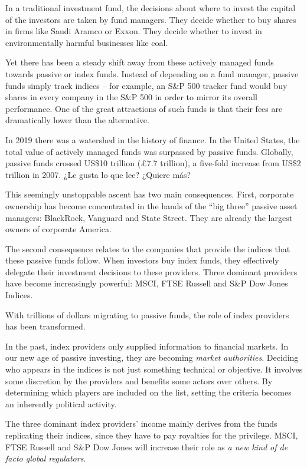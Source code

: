 \documentclass[
]{book}
\begin{document}
In a traditional investment fund, the decisions about where to invest the capital of the investors are taken by fund managers. They decide whether to buy shares in firms like Saudi Aramco or Exxon. They decide whether to invest in environmentally harmful businesses like coal.

Yet there has been a steady shift away from these actively managed funds towards passive or index funds. Instead of depending on a fund manager, passive funds simply track indices -- for example, an S\&P 500 tracker fund would buy shares in every company in the S\&P 500 in order to mirror its overall performance. One of the great attractions of such funds is that their fees are dramatically lower than the alternative.

In 2019 there was a watershed in the history of finance. In the United States, the total value of actively managed funds was surpassed by passive funds. Globally, passive funds crossed US\$10 trillion (£7.7 trillion), a five-fold increase from US\$2 trillion in 2007.
¿Le gusta lo que lee? ¿Quiere más?

This seemingly unstoppable ascent has two main consequences. First, corporate ownership has become concentrated in the hands of the ``big three'' passive asset managers: BlackRock, Vanguard and State Street. They are already the largest owners of corporate America.

The second consequence relates to the companies that provide the indices that these passive funds follow. When investors buy index funds, they effectively delegate their investment decisions to these providers. Three dominant providers have become increasingly powerful: MSCI, FTSE Russell and S\&P Dow Jones Indices.

With trillions of dollars migrating to passive funds, the role of index providers has been transformed.

In the past, index providers only supplied information to financial markets. In our new age of passive investing, they are becoming \emph{market authorities}.
Deciding who appears in the indices is not just something technical or objective. It involves some discretion by the providers and benefits some actors over others. By determining which players are included on the list, setting the criteria becomes an inherently political activity.

The three dominant index providers' income mainly derives from the funds replicating their indices, since they have to pay royalties for the privilege.
MSCI, FTSE Russell and S\&P Dow Jones will increase their role as \emph{a new kind of de facto
global regulators}.
\end{document}
